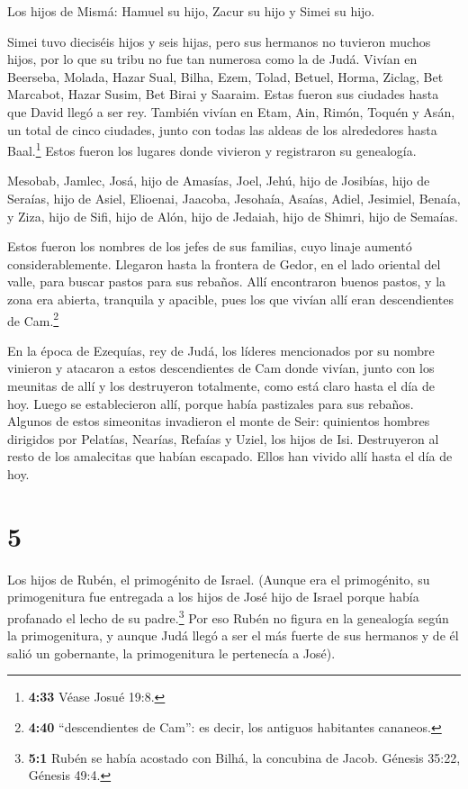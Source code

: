  Los hijos de Mismá: Hamuel su hijo, Zacur su hijo y Simei
su hijo.

 Simei tuvo dieciséis hijos y seis hijas, pero sus hermanos
no tuvieron muchos hijos, por lo que su tribu no fue tan numerosa como
la de Judá.  Vivían en Beerseba, Molada, Hazar Sual,
 Bilha, Ezem, Tolad,  Betuel, Horma, Ziclag,
 Bet Marcabot, Hazar Susim, Bet Birai y Saaraim. Estas
fueron sus ciudades hasta que David llegó a ser rey. 
También vivían en Etam, Ain, Rimón, Toquén y Asán, un total de cinco
ciudades,  junto con todas las aldeas de los alrededores
hasta Baal.\footnote{\textbf{4:33} Véase Josué 19:8.} Estos fueron los
lugares donde vivieron y registraron su genealogía.

 Mesobab, Jamlec, Josá, hijo de Amasías, 
Joel, Jehú, hijo de Josibías, hijo de Seraías, hijo de Asiel,
 Elioenai, Jaacoba, Jesohaía, Asaías, Adiel, Jesimiel,
Benaía,  y Ziza, hijo de Sifi, hijo de Alón, hijo de
Jedaiah, hijo de Shimri, hijo de Semaías.

 Estos fueron los nombres de los jefes de sus familias,
cuyo linaje aumentó considerablemente.  Llegaron hasta la
frontera de Gedor, en el lado oriental del valle, para buscar pastos
para sus rebaños.  Allí encontraron buenos pastos, y la
zona era abierta, tranquila y apacible, pues los que vivían allí eran
descendientes de Cam.\footnote{\textbf{4:40} ``descendientes de Cam'':
  es decir, los antiguos habitantes cananeos.}

 En la época de Ezequías, rey de Judá, los líderes
mencionados por su nombre vinieron y atacaron a estos descendientes de
Cam donde vivían, junto con los meunitas de allí y los destruyeron
totalmente, como está claro hasta el día de hoy. Luego se establecieron
allí, porque había pastizales para sus rebaños.  Algunos de
estos simeonitas invadieron el monte de Seir: quinientos hombres
dirigidos por Pelatías, Nearías, Refaías y Uziel, los hijos de Isi.
 Destruyeron al resto de los amalecitas que habían
escapado. Ellos han vivido allí hasta el día de hoy.

\hypertarget{section-4}{%
\section{5}\label{section-4}}

 Los hijos de Rubén, el primogénito de Israel. (Aunque era
el primogénito, su primogenitura fue entregada a los hijos de José hijo
de Israel porque había profanado el lecho de su padre.\footnote{\textbf{5:1}
  Rubén se había acostado con Bilhá, la concubina de Jacob. Génesis
  35:22, Génesis 49:4.} Por eso Rubén no figura en la genealogía según
la primogenitura,  y aunque Judá llegó a ser el más fuerte
de sus hermanos y de él salió un gobernante, la primogenitura le
pertenecía a José).


